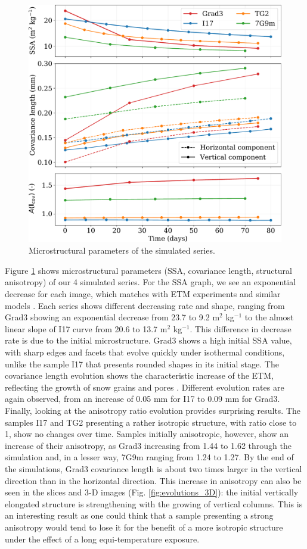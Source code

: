 \documentclass[draft,ms]{agujournal2019}
\begin{document}
\begin{figure}
    \centering
    \includegraphics[width=0.75\linewidth]{Figures/4images_microstruct.pdf}
    \caption{Microstructural parameters of the simulated series.}
    \label{fig:4_images_microstruct}
\end{figure}
Figure \ref{fig:4_images_microstruct} shows microstructural parameters (SSA, covariance length, structural anisotropy) of our 4 simulated series. For the SSA graph, we see an exponential decrease for each image, which matches with ETM experiments and similar models \cite{kaempfer_observation_2007, vetter_simulating_2010}. Each series shows different decreasing rate and shape, ranging from Grad3 showing an exponential decrease from 23.7 to 9.2 m$^2$ kg$^{-1}$ to the almost linear slope of I17 curve from 20.6 to 13.7 m$^2$ kg$^{-1}$. This difference in decrease rate is due to the initial microstructure. Grad3 shows a high initial SSA value, with sharp edges and facets that evolve quickly under isothermal conditions, unlike the sample I17 that presents rounded shapes in its initial stage.
The covariance length evolution shows the characteristic increase of the ETM, reflecting the growth of snow grains and pores \cite{calonne_study_2014, lowe2011interfacial}. Different evolution rates are again observed, from an increase of 0.05 mm for I17 to 0.09 mm for Grad3. Finally, looking at the anisotropy ratio evolution provides surprising results. The samples I17 and TG2 presenting a rather isotropic structure, with ratio close to 1, show no changes over time. Samples initially anisotropic, however, show an increase of their anisotropy, as Grad3 increasing from 1.44 to 1.62 through the simulation and, in a lesser way, 7G9m ranging from 1.24 to 1.27. By the end of the simulations, Grad3 covariance length is about two times larger in the vertical direction than in the horizontal direction. This increase in anisotropy can also be seen in the slices and 3-D images (Fig. \ref{fig:evolutions_3D}): the initial vertically elongated structure is strengthening with the growing of vertical columns. This is an interesting result as one could think that a sample presenting a strong anisotropy would tend to lose it for the benefit of a more isotropic structure under the effect of a long equi-temperature exposure.
\end{document}
